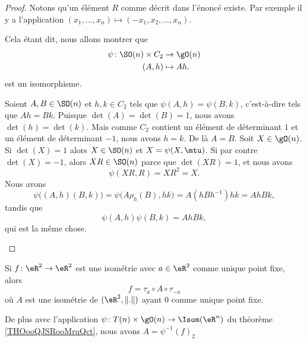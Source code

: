 \begin{proof}
	Notons qu'un élément \( R\) comme décrit dans l'énoncé existe. Par exemple il y a l'application  \( (x_1,\ldots, x_n)\mapsto (-x_1,x_2,\ldots, x_n)\).

	Cela étant dit, nous allons montrer que
	\begin{equation}
		\begin{aligned}
			\psi\colon \SO(n)\times C_2 & \to \gO(n)  \\
			(A,h)                       & \mapsto Ah.
		\end{aligned}
	\end{equation}
	est un isomorphisme.
	\begin{subproof}
		\spitem[Injectif]
		Soient \( A,B\in \SO(n)\) et \( h,k\in C_2\) tels que \( \psi(A,h)=\psi(B,k)\), c'est-à-dire tels que \( Ah=Bk\). Puisque \( \det(A)=\det(B)=1\), nous avons \( \det(h)=\det(k)\). Mais comme \( C_2\) contient un élément de déterminant \( 1\) et un élément de déterminant \( -1\), nous avons \( h=k\). De là \( A=B\).
		\spitem[Surjectif]
		Soit \( X\in\gO(n)\). Si \( \det(X)=1\) alors \( X\in \SO(n)\) et \( X=\psi(X,\mtu)\). Si par contre \( \det(X)=-1\), alors \( XR\in\SO(n)\) parce que \( \det(XR)=1\), et nous avons
		\begin{equation}
			\psi(XR,R)=XR^2=X.
		\end{equation}
		\spitem[Morphisme]
		Nous avons
		\begin{equation}
			\psi\Big( (A,h)(B,k) \Big)=\psi\big( A\rho_h(B),hk \big)=A(hBh^{-1})hk=AhBk,
		\end{equation}
		tandis que
		\begin{equation}
			\psi(A,h)\psi(B,k)=AhBk,
		\end{equation}
		qui est la même chose.
	\end{subproof}
\end{proof}


\begin{proposition}	\label{PROPooOGHYooYgPkuE}
	Si \(f \colon \eR^2\to \eR^2  \) est une isométrie avec \( a\in \eR^2\) comme unique point fixe, alors
	\begin{equation}
		f=\tau_{a}\circ A\circ \tau_{-a}
	\end{equation}
	où \( A\) est une isométrie de \( (\eR^2,\| . \|)\) ayant \( 0\) comme unique point fixe.

	De plus avec l'application \(\psi \colon T(n)\times \gO(n)\to \Isom(\eR^n)  \) du théorème \ref{THOooQJSRooMrqQct}, nous avons \( A=\psi^{-1}(f)_2\)
\end{proposition}

